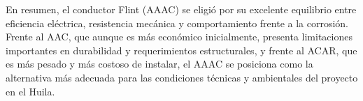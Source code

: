 En resumen, el conductor Flint (AAAC) se eligió por su excelente equilibrio entre eficiencia eléctrica, resistencia mecánica y comportamiento frente a la corrosión. Frente al AAC, que aunque es más económico inicialmente, presenta limitaciones importantes en durabilidad y requerimientos estructurales, y frente al ACAR, que es más pesado y más costoso de instalar, el AAAC se posiciona como la alternativa más adecuada para las condiciones técnicas y ambientales del proyecto en el Huila.